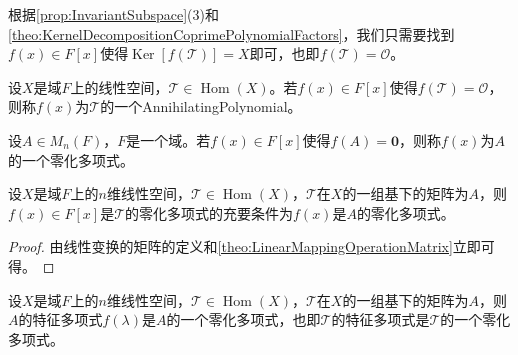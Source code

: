\begin{note}
	根据\cref{prop:InvariantSubspace}(3)和\cref{theo:KernelDecompositionCoprimePolynomialFactors}，我们只需要找到$f(x)\in F[x]$使得$\operatorname{Ker}[f(\mathcal{T})]=X$即可，也即$f(\mathcal{T})=\mathcal{O}$。
\end{note}
\begin{definition}
	设$X$是域$F$上的线性空间，$\mathcal{T}\in\operatorname{Hom}(X)$。若$f(x)\in F[x]$使得$f(\mathcal{T})=\mathcal{O}$，则称$f(x)$为$\mathcal{T}$的一个\gls{AnnihilatingPolynomial}。
\end{definition}
\begin{definition}
	设$A\in M_{n}(F)$，$F$是一个域。若$f(x)\in F[x]$使得$f(A)=\mathbf{0}$，则称$f(x)$为$A$的一个零化多项式。
\end{definition}
\begin{property}\label{prop:AnnihilatingPolynomial}
	设$X$是域$F$上的$n$维线性空间，$\mathcal{T}\in\operatorname{Hom}(X)$，$\mathcal{T}$在$X$的一组基下的矩阵为$A$，则$f(x)\in F[x]$是$\mathcal{T}$的零化多项式的充要条件为$f(x)$是$A$的零化多项式。
\end{property}
\begin{proof}
	由线性变换的矩阵的定义和\cref{theo:LinearMappingOperationMatrix}立即可得。
\end{proof}
\begin{theorem}\label{theo:HamiltonCayley}
	设$X$是域$F$上的$n$维线性空间，$\mathcal{T}\in\operatorname{Hom}(X)$，$\mathcal{T}$在$X$的一组基下的矩阵为$A$，则$A$的特征多项式$f(\lambda)$是$A$的一个零化多项式，也即$\mathcal{T}$的特征多项式是$\mathcal{T}$的一个零化多项式。
\end{theorem}
